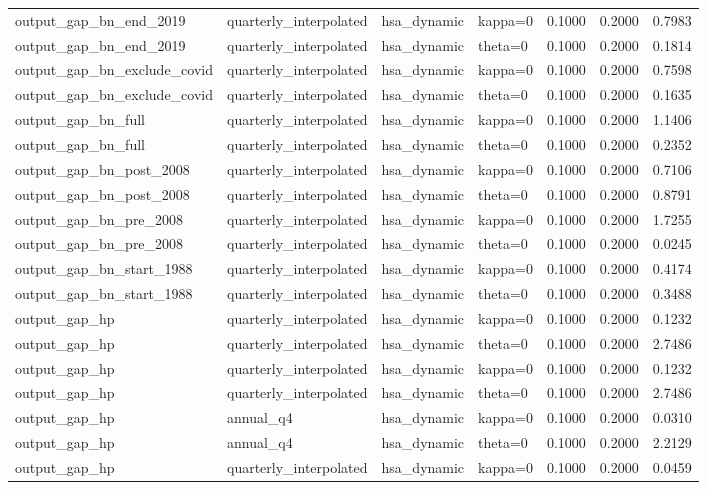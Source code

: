 \begin{tabular}{llllrrr}
output\_gap\_bn\_end\_2019 & quarterly\_interpolated & hsa\_dynamic & kappa=0 & 0.1000 & 0.2000 & 0.7983 \\
output\_gap\_bn\_end\_2019 & quarterly\_interpolated & hsa\_dynamic & theta=0 & 0.1000 & 0.2000 & 0.1814 \\
output\_gap\_bn\_exclude\_covid & quarterly\_interpolated & hsa\_dynamic & kappa=0 & 0.1000 & 0.2000 & 0.7598 \\
output\_gap\_bn\_exclude\_covid & quarterly\_interpolated & hsa\_dynamic & theta=0 & 0.1000 & 0.2000 & 0.1635 \\
output\_gap\_bn\_full & quarterly\_interpolated & hsa\_dynamic & kappa=0 & 0.1000 & 0.2000 & 1.1406 \\
output\_gap\_bn\_full & quarterly\_interpolated & hsa\_dynamic & theta=0 & 0.1000 & 0.2000 & 0.2352 \\
output\_gap\_bn\_post\_2008 & quarterly\_interpolated & hsa\_dynamic & kappa=0 & 0.1000 & 0.2000 & 0.7106 \\
output\_gap\_bn\_post\_2008 & quarterly\_interpolated & hsa\_dynamic & theta=0 & 0.1000 & 0.2000 & 0.8791 \\
output\_gap\_bn\_pre\_2008 & quarterly\_interpolated & hsa\_dynamic & kappa=0 & 0.1000 & 0.2000 & 1.7255 \\
output\_gap\_bn\_pre\_2008 & quarterly\_interpolated & hsa\_dynamic & theta=0 & 0.1000 & 0.2000 & 0.0245 \\
output\_gap\_bn\_start\_1988 & quarterly\_interpolated & hsa\_dynamic & kappa=0 & 0.1000 & 0.2000 & 0.4174 \\
output\_gap\_bn\_start\_1988 & quarterly\_interpolated & hsa\_dynamic & theta=0 & 0.1000 & 0.2000 & 0.3488 \\
output\_gap\_hp & quarterly\_interpolated & hsa\_dynamic & kappa=0 & 0.1000 & 0.2000 & 0.1232 \\
output\_gap\_hp & quarterly\_interpolated & hsa\_dynamic & theta=0 & 0.1000 & 0.2000 & 2.7486 \\
output\_gap\_hp & quarterly\_interpolated & hsa\_dynamic & kappa=0 & 0.1000 & 0.2000 & 0.1232 \\
output\_gap\_hp & quarterly\_interpolated & hsa\_dynamic & theta=0 & 0.1000 & 0.2000 & 2.7486 \\
output\_gap\_hp & annual\_q4 & hsa\_dynamic & kappa=0 & 0.1000 & 0.2000 & 0.0310 \\
output\_gap\_hp & annual\_q4 & hsa\_dynamic & theta=0 & 0.1000 & 0.2000 & 2.2129 \\
output\_gap\_hp & quarterly\_interpolated & hsa\_dynamic & kappa=0 & 0.1000 & 0.2000 & 0.0459 \\

\end{tabular}
